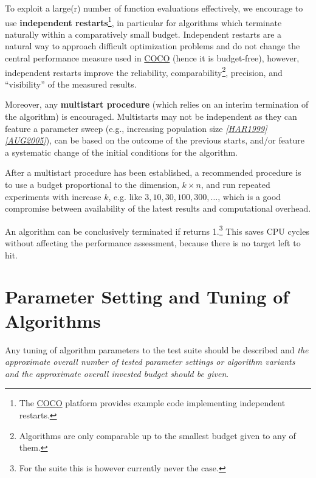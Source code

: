 \documentclass[letterpaper,12pt,english]{article}
\begin{document}
To exploit a large(r) number of function evaluations effectively, we encourage to
use \textbf{independent restarts}\footnote[3]{
The \href{https://github.com/numbbo/coco}{COCO} platform provides example code implementing independent restarts.
}, in particular for algorithms which terminate
naturally within a comparatively small budget.
Independent restarts are a natural way to approach difficult optimization
problems and do not change the central performance measure used in \href{https://github.com/numbbo/coco}{COCO} (hence it is budget-free),
however,
independent restarts improve the reliability, comparability\footnote[4]{
Algorithms are only comparable up to the smallest budget given to
any of them.
}, precision, and ``visibility'' of the measured results.

Moreover, any \textbf{multistart procedure} (which relies on an interim termination of the algorithm) is encouraged.
Multistarts may not be independent as they can feature a parameter sweep (e.g., increasing population size \label{index:id15}{\hyperref[index:har1999]{\emph{{[}HAR1999{]}}}} \label{index:id16}{\hyperref[index:aug2005]{\emph{{[}AUG2005{]}}}}), can be based on the outcome of the previous starts, and/or feature a systematic change of the initial conditions for the algorithm.

After a multistart procedure has been established, a recommended procedure is
to use a budget proportional to the dimension, \(k\times n\), and run
repeated experiments with increase \(k\), e.g. like
\(3, 10, 30, 100, 300,\dots\), which is a good compromise between
availability of the latest results and computational overhead.

An algorithm can be conclusively terminated if
\href{http://numbbo.github.io/coco-doc/C/coco\_8h.html\#a1164d85fd641ca48046b943344ae9069}{} returns 1.\footnote[5]{
For the  suite this is however currently never the case.
} This saves CPU cycles without
affecting the performance assessment, because there is no target left to hit.


\section{Parameter Setting and Tuning of Algorithms}
\label{index:sec-tuning}\label{index:parameter-setting-and-tuning-of-algorithms}
Any tuning of algorithm parameters to the test suite should be described and
\emph{the approximate overall number of tested parameter settings or algorithm
variants and the approximate overall invested budget should be given}.
\end{document}
